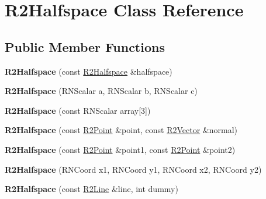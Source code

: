 \hypertarget{class_r2_halfspace}{}\section{R2\+Halfspace Class Reference}
\label{class_r2_halfspace}
\subsection*{Public Member Functions}
\begin{DoxyCompactItemize}
\item 
{\bfseries R2\+Halfspace} (const \hyperlink{class_r2_halfspace}{R2\+Halfspace} \&halfspace)\hypertarget{class_r2_halfspace_a274fe9c095db9fc8f1119eb4724f866c}{}\label{class_r2_halfspace_a274fe9c095db9fc8f1119eb4724f866c}

\item 
{\bfseries R2\+Halfspace} (R\+N\+Scalar a, R\+N\+Scalar b, R\+N\+Scalar c)\hypertarget{class_r2_halfspace_a21685c98735c322781a57982ecf6baf7}{}\label{class_r2_halfspace_a21685c98735c322781a57982ecf6baf7}

\item 
{\bfseries R2\+Halfspace} (const R\+N\+Scalar array\mbox{[}3\mbox{]})\hypertarget{class_r2_halfspace_a046a88ff8f0fd726ee49204b50095712}{}\label{class_r2_halfspace_a046a88ff8f0fd726ee49204b50095712}

\item 
{\bfseries R2\+Halfspace} (const \hyperlink{class_r2_point}{R2\+Point} \&point, const \hyperlink{class_r2_vector}{R2\+Vector} \&normal)\hypertarget{class_r2_halfspace_a10ab4f04e9405d44d23eaf9bbe0867a6}{}\label{class_r2_halfspace_a10ab4f04e9405d44d23eaf9bbe0867a6}

\item 
{\bfseries R2\+Halfspace} (const \hyperlink{class_r2_point}{R2\+Point} \&point1, const \hyperlink{class_r2_point}{R2\+Point} \&point2)\hypertarget{class_r2_halfspace_a6d928a9d85ba9f15dc7b44c556ea6e92}{}\label{class_r2_halfspace_a6d928a9d85ba9f15dc7b44c556ea6e92}

\item 
{\bfseries R2\+Halfspace} (R\+N\+Coord x1, R\+N\+Coord y1, R\+N\+Coord x2, R\+N\+Coord y2)\hypertarget{class_r2_halfspace_a2aba8158a4c3a2069fdc98a170052ed2}{}\label{class_r2_halfspace_a2aba8158a4c3a2069fdc98a170052ed2}

\item 
{\bfseries R2\+Halfspace} (const \hyperlink{class_r2_line}{R2\+Line} \&line, int dummy)\hypertarget{class_r2_halfspace_ae25c56da3f9d29ec4e7cbcecd04eafeb}{}\label{class_r2_halfspace_ae25c56da3f9d29ec4e7cbcecd04eafeb}


\end{DoxyCompactItemize}
